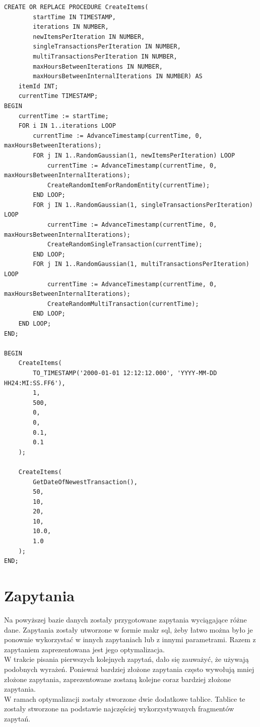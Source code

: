 \documentclass[11pt]{article}
\numberwithin{figure}{subsection}
\begin{document}
	
	\begin{lstlisting}[caption={Wygenerowanie wielu różnych tranzakcji i
	tworzenia przedmiotów},captionpos=b]
CREATE OR REPLACE PROCEDURE CreateItems(
		startTime IN TIMESTAMP,
		iterations IN NUMBER,
		newItemsPerIteration IN NUMBER,
		singleTransactionsPerIteration IN NUMBER,
		multiTransactionsPerIteration IN NUMBER,
		maxHoursBetweenIterations IN NUMBER,
		maxHoursBetweenInternalIterations IN NUMBER) AS
	itemId INT;
	currentTime TIMESTAMP;
BEGIN
	currentTime := startTime;
	FOR i IN 1..iterations LOOP
		currentTime := AdvanceTimestamp(currentTime, 0, maxHoursBetweenIterations);
		FOR j IN 1..RandomGaussian(1, newItemsPerIteration) LOOP
			currentTime := AdvanceTimestamp(currentTime, 0, maxHoursBetweenInternalIterations);
			CreateRandomItemForRandomEntity(currentTime);
		END LOOP;
		FOR j IN 1..RandomGaussian(1, singleTransactionsPerIteration) LOOP
			currentTime := AdvanceTimestamp(currentTime, 0, maxHoursBetweenInternalIterations);
			CreateRandomSingleTransaction(currentTime);
		END LOOP;
		FOR j IN 1..RandomGaussian(1, multiTransactionsPerIteration) LOOP
			currentTime := AdvanceTimestamp(currentTime, 0, maxHoursBetweenInternalIterations);
			CreateRandomMultiTransaction(currentTime);
		END LOOP;
	END LOOP;
END;
	
BEGIN
	CreateItems(
		TO_TIMESTAMP('2000-01-01 12:12:12.000', 'YYYY-MM-DD HH24:MI:SS.FF6'),
		1,
		500,
		0,
		0,
		0.1,
		0.1
	);
	
	CreateItems(
		GetDateOfNewestTransaction(),
		50,
		10,
		20,
		10,
		10.0,
		1.0
	);
END;
    \end{lstlisting}

\section{Zapytania}
	Na powyższej bazie danych zostały przygotowane zapytania wyciągające różne
	dane. Zapytania zostały utworzone w formie makr sql, żeby łatwo można było
	je ponownie wykorzystać w innych zapytaniach lub z innymi parametrami. Razem
	z zapytaniem zaprezentowana jest jego optymalizacja.
	\\
	W trakcie pisania pierwszych kolejnych zapytań, dało się zauważyć, że
	używają podobnych wyrażeń. Ponieważ bardziej złożone zapytania często
	wywołują mniej złożone zapytania, zaprezentowane zostaną kolejne coraz
	bardziej złożone zapytania.
	\\
	W ramach optymalizacji zostały stworzone dwie dodatkowe tablice. Tablice te
	zostały stworzone na podstawie najczęściej wykorzystywanych fragmentów
	zapytań.
	
\end{document}
